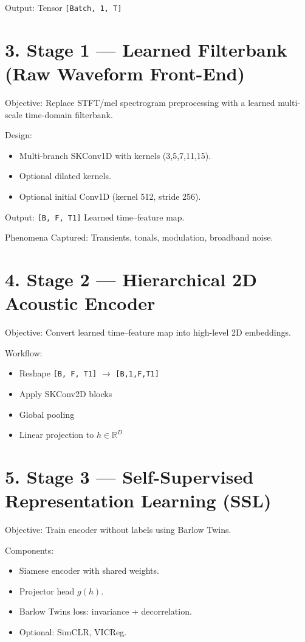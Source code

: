 \documentclass[11pt,a4paper]{article}
\begin{document}
Output: Tensor \texttt{[Batch, 1, T]}

\section*{3. Stage 1 — Learned Filterbank (Raw Waveform Front-End)}

Objective: Replace STFT/mel spectrogram preprocessing with a learned multi-scale time-domain filterbank.

Design:
\begin{itemize}
\item Multi-branch SKConv1D with kernels (3,5,7,11,15).
\item Optional dilated kernels.
\item Optional initial Conv1D (kernel 512, stride 256).
\end{itemize}

Output: \texttt{[B, F, T1]} Learned time--feature map.

Phenomena Captured: Transients, tonals, modulation, broadband noise.

\section*{4. Stage 2 — Hierarchical 2D Acoustic Encoder}

Objective: Convert learned time--feature map into high-level 2D embeddings.

Workflow:
\begin{itemize}
\item Reshape \texttt{[B, F, T1]} $\rightarrow$ \texttt{[B,1,F,T1]}
\item Apply SKConv2D blocks
\item Global pooling
\item Linear projection to $h \in \mathbb{R}^{D}$
\end{itemize}

\section*{5. Stage 3 — Self-Supervised Representation Learning (SSL)}

Objective: Train encoder without labels using Barlow Twins.

Components:
\begin{itemize}
\item Siamese encoder with shared weights.
\item Projector head $g(h)$.
\item Barlow Twins loss: invariance + decorrelation.
\item Optional: SimCLR, VICReg.
\end{itemize}
\end{document}
